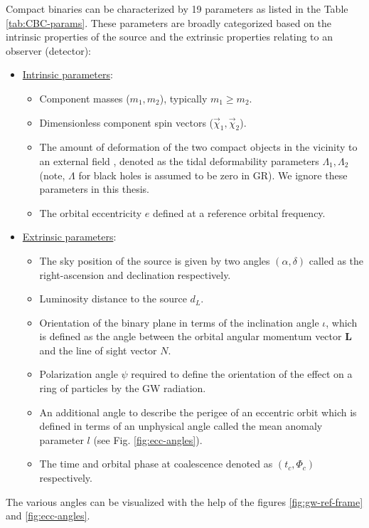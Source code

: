 Compact binaries can be characterized by 19 parameters as listed in the Table \ref{tab:CBC-params}. These parameters are broadly categorized based on the intrinsic properties of the source and the extrinsic properties relating to an observer (detector): 
\begin{itemize}
    \item \underline{Intrinsic parameters}: 
    \begin{itemize}
        \item Component masses ($m_1, m_2$), typically $m_1 \geq m_2$.
        \item Dimensionless component spin vectors ($\vec{\chi}_1, \vec{\chi}_2$).
        \item The amount of deformation of the two compact objects in the vicinity to an external field \cite{Hinderer:2007mb}, denoted as the tidal deformability parameters $\Lambda_1, \Lambda_2$ (note, $\Lambda$ for black holes is assumed to be zero in GR). We ignore these parameters in this thesis.
        \item The orbital eccentricity $e$ defined at a reference orbital frequency.
    \end{itemize}
    \item \underline{Extrinsic parameters}:
    \begin{itemize}
        \item The sky position of the source is given by two angles $(\alpha, \delta)$ called as the right-ascension and declination respectively.
        \item Luminosity distance to the source $d_L$.
        \item Orientation of the binary plane in terms of the inclination angle $\iota$, which is defined as the angle between the orbital angular momentum vector \textbf{L} and the line of sight vector $N$.
        \item Polarization angle $\psi$ required to define the orientation of the effect on a ring of particles by the GW radiation.
        \item An additional angle to describe the perigee of an eccentric orbit which is defined in terms of an unphysical angle called the mean anomaly parameter $l$ (see Fig. \ref{fig:ecc-angles}).
        \item  The time and orbital phase at coalescence denoted as $(t_c, \Phi_c)$ respectively.
    \end{itemize}  
\end{itemize}
The various angles can be visualized with the help of the figures \ref{fig:gw-ref-frame} and 
\ref{fig:ecc-angles}.

